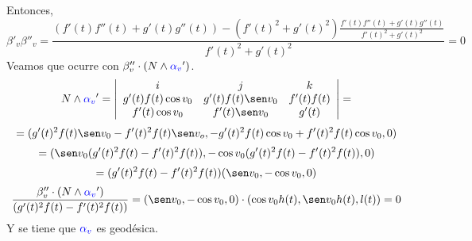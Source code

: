 \documentclass{article}
\begin{document}
Entonces,
$$
\beta'_v\beta''_v =
\frac{
    (f'(t)f''(t) + g'(t)g''(t)) - (f'(t)^2 + g'(t)^2) \frac{f'(t)f''(t) + g'(t)g''(t)}{f'(t)^2 + g'(t)^2}}{f'(t)^2 + g'(t)^2}
= 0
$$
Veamos que ocurre con $\beta_v''\cdot(N \land \textcolor{blue}{\alpha_v}')$.
$$
N \land \textcolor{blue}{\alpha_v}' =
\left|\begin{array}{ccc}
    i & j & k \\
    g'(t)f(t) \cos v_0 & g'(t)f(t)\sen v_0 & f'(t)f(t) \\
    f'(t)\cos v_0 & f'(t) \sen v_0 & g'(t) \\
\end{array}\right| =
$$
$$
= ( g'(t)^2f(t)\sen v_0 - f'(t)^2f(t)\sen v_o , -g'(t)^2f(t)\cos v_0 + f'(t)^2f(t)\cos v_0, 0 )
$$
$$
= ( \sen v_0 (g'(t)^2f(t)- f'(t)^2f(t)) , -\cos v_0(g'(t)^2f(t) - f'(t)^2f(t)), 0 )
$$
$$
= (g'(t)^2f(t)- f'(t)^2f(t))(\sen v_0, -\cos v_0, 0 )
$$
$$
\frac{\beta_v''\cdot(N \land \textcolor{blue}{\alpha_v}')}{(g'(t)^2f(t)- f'(t)^2f(t))} =
(\sen v_0, -\cos v_0, 0 ) \cdot
( \cos v_0 h(t), \sen v_0 h(t), l(t) ) = 0
$$
Y se tiene que $\textcolor{blue}{\alpha_v}$ es geodésica.
\end{document}
